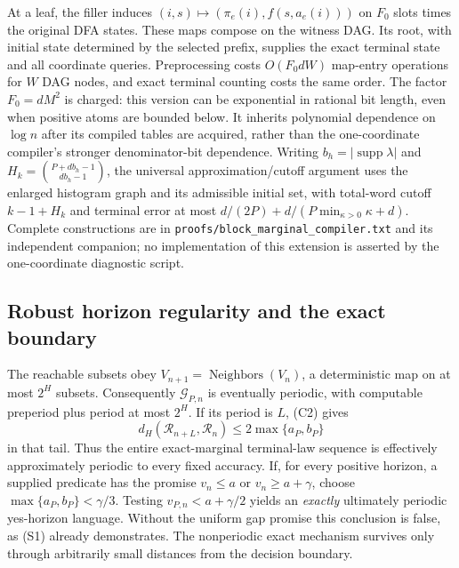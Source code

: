 \documentclass[11pt]{article}
\begin{document}
At a leaf, the filler induces $(i,s)\mapsto(\pi_e(i),f(s,a_e(i)))$ on $F_0$ slots times the original DFA states. These maps compose on the witness DAG. Its root, with initial state determined by the selected prefix, supplies the exact terminal state and all coordinate queries. Preprocessing costs $O(F_0dW)$ map-entry operations for $W$ DAG nodes, and exact terminal counting costs the same order. The factor $F_0=dM^2$ is charged: this version can be exponential in rational bit length, even when positive atoms are bounded below. It inherits polynomial dependence on $\log n$ after its compiled tables are acquired, rather than the one-coordinate compiler's stronger denominator-bit dependence. Writing $b_h=|\operatorname{supp}\lambda|$ and $H_k=\binom{P+db_h-1}{db_h-1}$, the universal approximation/cutoff argument uses the enlarged histogram graph and its admissible initial set, with total-word cutoff $k-1+H_k$ and terminal error at most $d/(2P)+d/(P\min_{\kappa>0}\kappa+d)$. Complete constructions are in \texttt{proofs/block\_marginal\_compiler.txt} and its independent companion; no implementation of this extension is asserted by the one-coordinate diagnostic script.

\subsection{Robust horizon regularity and the exact boundary}

The reachable subsets obey $V_{n+1}=\operatorname{Neighbors}(V_n)$, a deterministic map on at most $2^H$ subsets. Consequently $\mathcal G_{P,n}$ is eventually periodic, with computable preperiod plus period at most $2^H$. If its period is $L$, (C2) gives
\[
d_H(\mathcal R_{n+L},\mathcal R_n)\le2\max\{a_P,b_P\}
\]
in that tail. Thus the entire exact-marginal terminal-law sequence is effectively approximately periodic to every fixed accuracy. If, for every positive horizon, a supplied predicate has the promise $v_n\le a$ or $v_n\ge a+\gamma$, choose $\max\{a_P,b_P\}<\gamma/3$. Testing $v_{P,n}<a+\gamma/2$ yields an \emph{exactly} ultimately periodic yes-horizon language. Without the uniform gap promise this conclusion is false, as (S1) already demonstrates. The nonperiodic exact mechanism survives only through arbitrarily small distances from the decision boundary.
\end{document}
